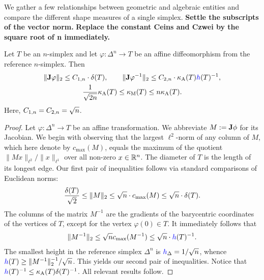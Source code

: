 \documentclass[10pt,a4paper]{article}
\newcommand{\todo}[1]{{\color{RedOrange}\textbf{#1}}}
\begin{document}
We gather a few relationships between geometric and algebraic entities and compare the different shape measures of a single simplex.
\todo{Settle the subscripts of the vector norm.}
\todo{Replace the constant Ceins and Czwei by the square root of n immediately.}

\begin{lemma}\label{lemma:measurerelationships}
    Let $T$ be an $n$-simplex and let $\varphi : \Delta^{n} \rightarrow T$ be an affine diffeomorphism from the reference $n$-simplex. Then 
    \begin{gather*} %
        \matnorm{ \Jacobian \varphi } 
        \leq 
        \Ceins{n} \cdot \diam(T),
        \qquad 
        \matnorm{ \Jacobian \varphi^{-1} } 
        \leq 
        \Czwei{n} \cdot \aspectratio(T) \height(T)^{-1}
        ,
        \\
        \frac{1}{\sqrt{2n}} \aspectratio(T) \leq \algebraicshapemeasure(T) \leq n \aspectratio(T).
    \end{gather*}
    Here, $C_{1,n} = C_{2,n} = \sqrt n$. 
\end{lemma}
\begin{proof}
    Let $\varphi : \Delta^{n} \rightarrow T$ be an affine transformation. 
    We abbreviate $M := {\mathbf{J}}\phi$ for its Jacobian. 
    We begin with observing that the largest $\ell^{2}$-norm of any column of $M$,
    which here denote by $c_{\max}(M)$, 
    equals the maximum of the quotient $\| M x \|_{\ell^{2}} / \| x \|_{\ell^{1}}$ over all non-zero $x \in {\mathbb R}^{n}$. 
    The diameter of $T$ is the length of its longest edge. 
    Our first pair of inequalities follows via standard comparisons of Euclidean norms:
    \begin{align*}
        \frac{{\delta}(T)}{\sqrt 2} \leq \|  M  \|_{2} \leq \sqrt{n} \cdot c_{\max}(M) \leq \sqrt{n} \cdot {\delta}(T).
    \end{align*}
    The columns of the matrix $M^{-1}$ are the gradients of the barycentric coordinates of the vertices of $T$,
    except for the vertex $\varphi(0) \in T$. It immediately follows that 
    \begin{align*}
        \matnorm{ M^{-1} } \leq \sqrt{n} c_{\max}(M^{-1}) \leq \sqrt{n} \cdot \height(T)^{-1}
        .
    \end{align*}
    The smallest height in the reference simplex $\Delta^{n}$ is $\height_{\Delta} = 1/\sqrt{n}$, 
    whence $\height(T) \geq \matnorm{M^{-1}}^{-1} / \sqrt{n}$. This yields our second pair of inequalities. 
    Notice that $\height(T)^{-1} \leq \aspectratio(T) \diam(T)^{-1}$.
    All relevant results follow.
\end{proof}
\end{document}
